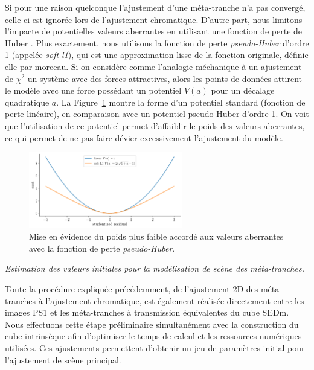 \documentclass[../main/main.tex]{subfiles}
\begin{document}
Si pour une raison quelconque l'ajustement d'une méta-tranche n'a pas
convergé, celle-ci est ignorée lors de l'ajustement chromatique. D'autre
part, nous limitons l'impacte de potentielles valeurs aberrantes en
utilisant une fonction de perte de Huber \citep{Huber1964}. Plus
exactement, nous utilisons la fonction de perte \textit{pseudo-Huber}
d'ordre 1 (appelée \textit{soft-l1}),
qui est une approximation lisse de la fonction originale, définie elle par
morceau.
Si on considère comme l'analogie méchanique à un ajustement de
$\chi^{2}$ un système avec des forces attractives, alors les points de
données attirent le modèle avec une force possédant un potentiel $V(a)$
pour un décalage quadratique $a$. La Figure~\ref{fig:softl1} montre la
forme d'un potentiel standard (fonction de perte linéaire), en
comparaison avec un potentiel pseudo-Huber d'ordre 1. On voit que
l'utilisation de ce potentiel permet d'affaiblir le poids des valeurs
aberrantes, ce qui permet de ne pas faire dévier excessivement
l'ajustement du modèle.

\begin{figure}[ht]
  \centering
  \includegraphics[width=0.6\textwidth]{../figures/07_scene/softl1.pdf}
  \caption[Fonction de perte \textit{pseudo-Huber}]{Mise en évidence du
    poids plus faible accordé aux valeurs aberrantes avec la fonction de perte \textit{pseudo-Huber}.}
  \label{fig:softl1}
\end{figure}

\begin{frshaded*}
  \footnotesize  
  \centerline{\emph{Estimation des valeurs initiales pour la modélisation
      de scène des méta-tranches.}}  
  Toute la procédure expliquée précédemment, de l'ajustement 2D des
  méta-tranches à l'ajustement chromatique, est également réalisée directement entre les images PS1 et les
  méta-tranches à transmission équivalentes du cube SEDm. Nous
  effectuons cette étape préliminaire simultanément
  avec la construction du cube intrinsèque afin d'optimiser le temps de
  calcul et les ressources numériques utilisées.
  Ces ajustements permettent d'obtenir un
  jeu de paramètres initial pour l'ajustement de scène principal.
\end{frshaded*}
\end{document}
